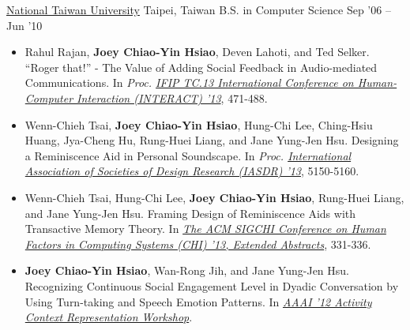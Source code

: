 \documentclass[10pt, a4paper]{article} %
\begin{document}
\headedsection %
{\href{http://www.ntu.edu.tw}{National Taiwan University}}
{Taipei, Taiwan}
{\headedsubsection %
	{B.S. in Computer Science}
	{Sep '06 -- Jun '10} 
	{\bodytext{}}
}

\spacedhrule{0.5em}{-1em} %



\begin{itemize}

\itemsep=0pt

\item Rahul Rajan, \textbf{Joey Chiao-Yin Hsiao}, Deven Lahoti, and Ted Selker. 
``Roger that!'' - The Value of Adding Social Feedback in Audio-mediated Communications. 
In \textit{Proc. \href{http://www.interact2013.org/}{IFIP TC.13 International Conference on Human-Computer Interaction (INTERACT) '13}}, 471-488.
\item Wenn-Chieh Tsai, \textbf{Joey Chiao-Yin Hsiao}, Hung-Chi Lee, Ching-Hsiu Huang, Jya-Cheng Hu, Rung-Huei Liang, and Jane Yung-Jen Hsu. 
Designing a Reminiscence Aid in Personal Soundscape. 
In \textit{Proc. \href{http://www.iasdr2013.jp/}{International Association of Societies of Design Research (IASDR) '13}}, 5150-5160.
\item Wenn-Chieh Tsai, Hung-Chi Lee, \textbf{Joey Chiao-Yin Hsiao}, Rung-Huei Liang, and Jane Yung-Jen Hsu. 
Framing Design of Reminiscence Aids with Transactive Memory Theory. 
In \textit{\href{http://chi2013.acm.org/}{The ACM SIGCHI Conference on Human Factors in Computing Systems (CHI) '13, Extended Abstracts}}, 331-336.
\item \textbf{Joey Chiao-Yin Hsiao}, Wan-Rong Jih, and Jane Yung-Jen Hsu. 
Recognizing Continuous Social Engagement Level in Dyadic Conversation by Using Turn-taking and Speech Emotion Patterns. 
In \textit{\href{http://activitycontext.org/aaai12-archive/aaai12/}{AAAI '12 Activity Context Representation Workshop}}.


\end{itemize}
\end{document}
